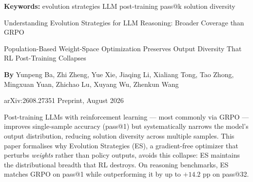 \documentclass[10pt,twocolumn]{article}
\begin{document}
\setlength{\parindent}{0pt}
\setlength{\parskip}{4pt}

{\small\color{keywordgray}\textbf{Keywords:}
  evolution strategies \textbullet{}
  LLM post-training \textbullet{}
  pass@k \textbullet{}
  solution diversity}\par\vspace{4pt}

{\LARGE\bfseries\raggedright
  Understanding Evolution Strategies for LLM
  Reasoning: Broader Coverage than GRPO}\par\vspace{4pt}

{\large\itshape\raggedright
  Population-Based Weight-Space Optimization Preserves Output
  Diversity That RL Post-Training Collapses}\par\vspace{6pt}

{\small\textbf{By} Yunpeng Ba, Zhi Zheng, Yue Xie, Jiaqing Li,
  Xialiang Tong, Tao Zhong, Mingxuan Yuan, Zhichao Lu,
  Xuyang Wu, Zhenkun Wang}\par\vspace{2pt}

{\small\color{keywordgray}arXiv:2608.27351 \textbullet{} Preprint, August 2026}
\par\vspace{2pt}\noindent{\color{rulered}\rule{\columnwidth}{0.6pt}}\vspace{6pt}

Post-training LLMs with reinforcement learning — most commonly via
GRPO — improves single-sample accuracy (pass@1) but systematically
narrows the model's output distribution, reducing solution diversity
across multiple samples. This paper formalises why Evolution Strategies
(ES), a gradient-free optimizer that perturbs \emph{weights} rather than
policy outputs, avoids this collapse: ES maintains the distributional
breadth that RL destroys. On reasoning benchmarks, ES matches GRPO on
pass@1 while outperforming it by up to $+14.2$ pp on pass@32.
\end{document}
